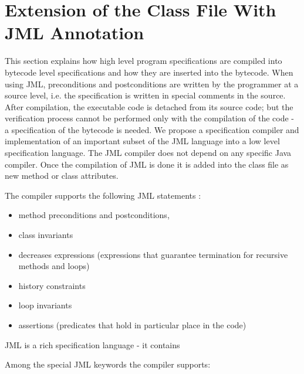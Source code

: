 
\section{Extension of the Class File With JML Annotation}\label{extClassJML}
This section explains how high level program specifications are compiled into bytecode level specifications and how they are inserted into the bytecode. 
When using JML, preconditions and postconditions are written by the programmer at a source level, i.e. the specification is written in special comments in the source. 
After compilation, the executable code is detached from its source code; but the verification process cannot be performed only with the compilation of the code - a specification of the bytecode is needed. 
We propose a specification compiler and implementation of an important subset of the JML language into a low level specification language. The JML compiler does not depend on any specific Java compiler. Once the compilation of JML is done it is added into the class file as new method or class attributes. 

The compiler supports the following JML statements :
\begin{itemize} 
	\item method preconditions and postconditions, 
	\item class invariants
	\item decreases expressions (expressions that guarantee termination for recursive methods and loops)
	\item history constraints
	\item loop invariants
	\item assertions (predicates that hold in particular place in the code) 
\end{itemize}

JML is a rich specification language - it contains 

Among the special JML keywords the compiler supports:

